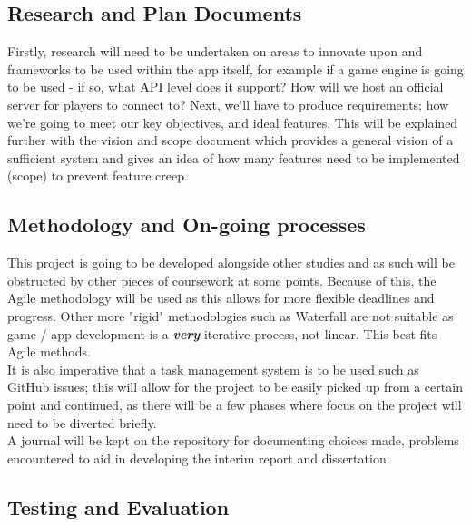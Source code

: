 \documentclass[12pt]{article}
\begin{document}
{\subsection*{Research and Plan Documents}

Firstly, research will need to be undertaken on areas to innovate upon and frameworks to be used within the app itself, for example if a game engine is going to be used - if so, what API level does it support? How will we host an official server for players to connect to? Next, we'll have to produce requirements; how we're going to meet our key objectives, and ideal features. This will be explained further with the vision and scope document which provides a general vision of a sufficient system and gives an idea of how many features need to be implemented (scope) to prevent feature creep.


\subsection*{Methodology and On-going processes}

This project is going to be developed alongside other studies and as such will be obstructed by other pieces of coursework at some points. Because of this, the Agile methodology will be used as this allows for more flexible deadlines and progress. Other more "rigid" methodologies such as Waterfall are not suitable as game / app development is a \textbf{\textit{very}} iterative process, not linear. This best fits Agile methods.  \\ 




It is also imperative that a task management system is to be used such as GitHub issues; this will allow for the project to be easily picked up from a certain point and continued, as there will be a few phases where focus on the project will need to be diverted briefly. \\

A journal will be kept on the repository for documenting choices made, problems encountered to aid in developing the interim report and dissertation. \\

\subsection*{Testing and Evaluation}

}
\end{document}
